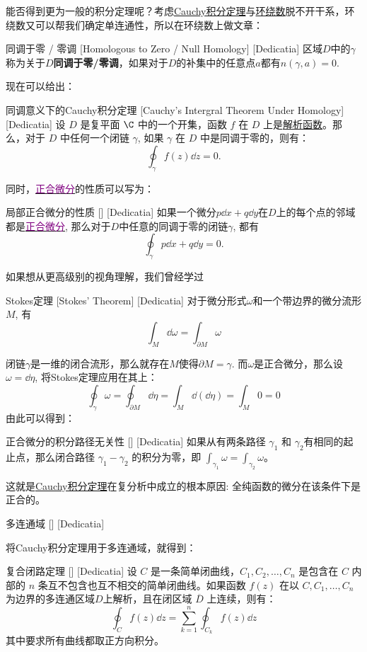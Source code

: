 \documentclass[UTF8]{ctexart}
\newcommand{\hyperrefc}[2]{\hyperref[#1]{\textcolor{purple}{#2}}}
\newcommand{\AnalyticalFunction}{\hyperref[dfn:AnalyticalFunction]{解析函数}}
\newcommand{\CauchyThm}{\hyperref[thm:Cauchy]{Cauchy积分定理}}
\begin{document}
能否得到更为一般的积分定理呢？考虑\CauchyThm 与\hyperref[dfn:WindingNumber]{环绕数}脱不开干系，环绕数又可以帮我们确定单连通性，所以在环绕数上做文章：
\begin{dfn}
    [UUID]
    {同调于零 / 零调\label{dfn:NullHomologous}}
    [Homologous to Zero / Null Homology]
    [Dedicatia]
    区域$D$中的$\gamma$称为关于$D$\textbf{同调于零/零调}，如果对于$D$的补集中的任意点$a$都有$n(\gamma,a)=0$.
\end{dfn}
现在可以给出：
\begin{thm}
    [UUID]
    {同调意义下的Cauchy积分定理}
    [Cauchy's Intergral Theorem Under Homology]
    [Dedicatia]
    设 \(D\) 是复平面 \(\C\) 中的一个开集，函数 \(f\) 在 \(D\) 上是\AnalyticalFunction 。那么，对于 \( D \) 中任何一个闭链 \( \gamma \), 如果 \( \gamma \) 在 \( D \) 中是同调于零的，则有：
    \[\oint_{\gamma} f(z) \dd z = 0.\]
\end{thm}
同时，\hyperrefc{dfn:ExactDifferential}{正合微分}的性质可以写为：
\begin{ppt}
    [UUID]
    {局部正合微分的性质}
    []
    [Dedicatia]
    如果一个微分$p\dd{x}+q\dd{y}$在$D$上的每个点的邻域都是\hyperrefc{dfn:ExactDifferential}{正合微分}, 那么对于$D$中任意的同调于零的闭链$\gamma$, 都有
    \[\oint_\gamma p\dd{x}+q\dd{y}=0.\]
\end{ppt}
如果想从更高级别的视角理解，我们曾经学过
\begin{thm}
    [UUID]
    {Stokes定理}
    [Stokes' Theorem]
    [Dedicatia]
    对于微分形式$\omega$和一个带边界的微分流形$M$, 有
    \[\int_{M} \dd\omega = \int_{\partial M} \omega\]
\end{thm}
闭链$\gamma$是一维的闭合流形，那么就存在$M$使得$\partial M=\gamma$. 而$\omega$是正合微分，那么设$\omega=\dd{\eta}$, 将Stokes定理应用在其上：
\[\oint_{\gamma} \omega = \oint_{\partial M} \dd\eta = \int_{M} \dd(\dd\eta) = \int_{M} 0 = 0\]
由此可以得到：
\begin{ppt}
    [UUID]
    {正合微分的积分路径无关性}
    []
    [Dedicatia]
    如果从有两条路径 $\gamma_1$ 和 $\gamma_2$有相同的起止点，那么闭合路径 $\gamma_1 - \gamma_2$ 的积分为零，即 $\int_{\gamma_1} \omega = \int_{\gamma_2} \omega$。
\end{ppt}
这就是\CauchyThm 在复分析中成立的根本原因: 全纯函数的微分在该条件下是正合的。
\begin{dfn}
    [UUID]
    {多连通域}
    []
    [Dedicatia]
\end{dfn}
将Cauchy积分定理用于多连通域，就得到：
\begin{thm}
    [UUID]
    {复合闭路定理}
    []
    [Dedicatia]
    设 $C$ 是一条简单闭曲线，$C_1, C_2, \ldots, C_n$ 是包含在 $C$ 内部的 $n$ 条互不包含也互不相交的简单闭曲线。如果函数 $f(z)$ 在以 $C, C_1, \ldots, C_n$ 为边界的多连通区域$D$上解析，且在闭区域 $\overline{D}$ 上连续，则有：
    $$\oint_C f(z) \dd z = \sum_{k=1}^n \oint_{C_k} f(z) \dd z$$
    其中要求所有曲线都取正方向积分。
\end{thm}
\end{document}
